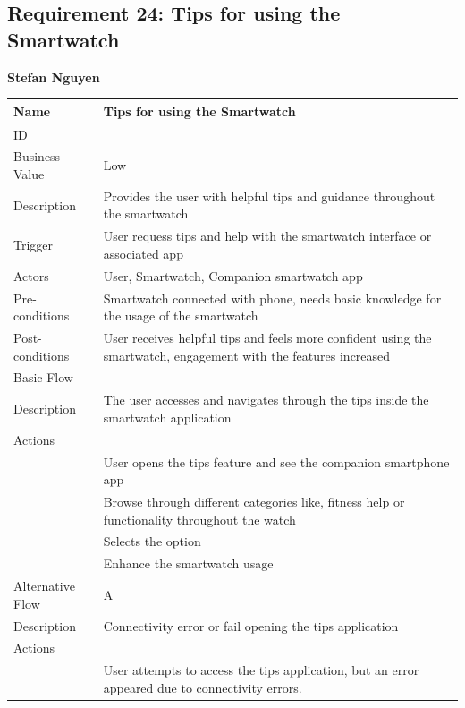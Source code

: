 \documentclass{article}
\begin{document}
\subsection{Requirement 24: Tips for using the Smartwatch}
	\textbf{Stefan Nguyen}
	\begin{center}
		\begin{tabularx}{1.0\textwidth}{|>{\raggedright\arraybackslash}p{}|>{\raggedright\arraybackslash}X|}
			\hline
			Name             & Tips for using the Smartwatch \\ \hline
			ID               & 24 \\ \hline
			Business Value   & Low \\ \hline
			Description      & Provides the user with helpful tips and guidance throughout the smartwatch \\ \hline
			Trigger          & User requess tips and help with the smartwatch interface or associated app \\ \hline
			Actors           & User, Smartwatch, Companion smartwatch app \\ \hline
			Pre-conditions   & Smartwatch connected with phone, needs basic knowledge for the usage of the smartwatch \\ \hline
			Post-conditions  & User receives helpful tips and feels more confident using the smartwatch, engagement with the features increased \\ \hline
			Basic Flow       & \\ \hline
							Description & The user accesses and navigates through the tips inside the smartwatch application \\ \hline
							Actions & \\ \hline
							1 & User opens the tips feature and see the companion smartphone app \\ \hline
							2 & Browse through different categories like, fitness help or functionality throughout the watch \\ \hline
							3 & Selects the option \\ \hline
							4 & Enhance the smartwatch usage \\ \hline
			Alternative Flow & A \\ \hline
							Description & Connectivity error or fail opening the tips application \\ \hline
							Actions & \\ \hline
							1 & User attempts to access the tips application, but an error appeared due to connectivity errors. \\ \hline

\end{tabularx}
\end{center}
\end{document}
